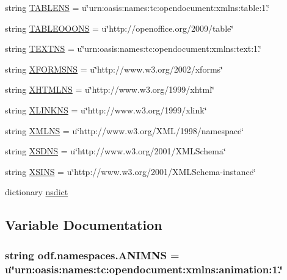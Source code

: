 \begin{DoxyCompactItemize}
\item 
string \hyperlink{namespaceodf_1_1namespaces_a95de09133333b21b515d8dc0c4296619}{T\+A\+B\+L\+E\+N\+S} = u\char`\"{}urn\+:oasis\+:names\+:tc\+:opendocument\+:xmlns\+:table\+:1.\char`\"{}
\item 
string \hyperlink{namespaceodf_1_1namespaces_aa808632fffea3942c6cba8d731791eb5}{T\+A\+B\+L\+E\+O\+O\+O\+N\+S} = u\char`\"{}http\+://openoffice.\+org/2009/table\char`\"{}
\item 
string \hyperlink{namespaceodf_1_1namespaces_a0639228e91d426c8b4b9fc0de566393a}{T\+E\+X\+T\+N\+S} = u\char`\"{}urn\+:oasis\+:names\+:tc\+:opendocument\+:xmlns\+:text\+:1.\char`\"{}
\item 
string \hyperlink{namespaceodf_1_1namespaces_aab47b5215a420501e95ca654941c2676}{X\+F\+O\+R\+M\+S\+N\+S} = u\char`\"{}http\+://www.\+w3.\+org/2002/xforms\char`\"{}
\item 
string \hyperlink{namespaceodf_1_1namespaces_a7b93ea22de258448c3a1a6953fa428b9}{X\+H\+T\+M\+L\+N\+S} = u\char`\"{}http\+://www.\+w3.\+org/1999/xhtml\char`\"{}
\item 
string \hyperlink{namespaceodf_1_1namespaces_a8ba6bb05d0fd8d856ffdc2c7667aa5a3}{X\+L\+I\+N\+K\+N\+S} = u\char`\"{}http\+://www.\+w3.\+org/1999/xlink\char`\"{}
\item 
string \hyperlink{namespaceodf_1_1namespaces_aed440da8646f3c462c833fc283ccb23c}{X\+M\+L\+N\+S} = u\char`\"{}http\+://www.\+w3.\+org/X\+M\+L/1998/namespace\char`\"{}
\item 
string \hyperlink{namespaceodf_1_1namespaces_ae0a786c0d6f5f8398bab5b18c062512d}{X\+S\+D\+N\+S} = u\char`\"{}http\+://www.\+w3.\+org/2001/X\+M\+L\+Schema\char`\"{}
\item 
string \hyperlink{namespaceodf_1_1namespaces_a46a3a0e49cc347678af5fb8d994652ce}{X\+S\+I\+N\+S} = u\char`\"{}http\+://www.\+w3.\+org/2001/X\+M\+L\+Schema-\/instance\char`\"{}
\item 
dictionary \hyperlink{namespaceodf_1_1namespaces_ae5c4cfaeef44ee2715cc52f618fc7397}{nsdict}
\end{DoxyCompactItemize}


\subsection{Variable Documentation}
\hypertarget{namespaceodf_1_1namespaces_a799446ad85a3db054a63ef0c7eb613a6}{
\subsubsection[{A\+N\+I\+M\+N\+S}]{\setlength{\rightskip}{0pt plus 5cm}string odf.\+namespaces.\+A\+N\+I\+M\+N\+S = u\char`\"{}urn\+:oasis\+:names\+:tc\+:opendocument\+:xmlns\+:animation\+:1.\char`\"{}}}\label{namespaceodf_1_1namespaces_a799446ad85a3db054a63ef0c7eb613a6}



